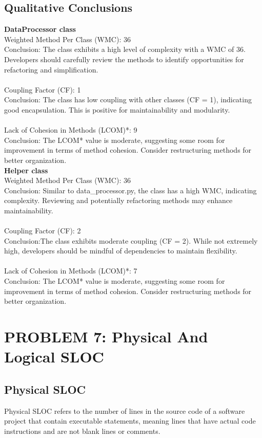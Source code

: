 \documentclass[runningheads]{llncs}
\begin{document}
\subsection{Qualitative Conclusions}
\textbf{DataProcessor class}\\
Weighted Method Per Class (WMC): 36\\
Conclusion: The class exhibits a high level of complexity with a WMC of 36. Developers should carefully review the methods to identify opportunities for refactoring and simplification.\\ \\
Coupling Factor (CF): 1\\
Conclusion: The class has low coupling with other classes (CF = 1), indicating good encapsulation. This is positive for maintainability and modularity.\\ \\
Lack of Cohesion in Methods (LCOM)*: 9\\
Conclusion: The LCOM* value is moderate, suggesting some room for improvement in terms of method cohesion. Consider restructuring methods for better organization.\\

\textbf{Helper class}\\
Weighted Method Per Class (WMC): 36\\
Conclusion: Similar to data\_processor.py, the class has a high WMC, indicating complexity. Reviewing and potentially refactoring methods may enhance maintainability.\\ \\
Coupling Factor (CF): 2\\
Conclusion:The class exhibits moderate coupling (CF = 2). While not extremely high, developers should be mindful of dependencies to maintain flexibility.\\ \\
Lack of Cohesion in Methods (LCOM)*: 7\\
Conclusion: The LCOM* value is moderate, suggesting some room for improvement in terms of method cohesion. Consider restructuring methods for better organization.

\section{PROBLEM 7: Physical And Logical SLOC}
\subsection{Physical SLOC}
Physical SLOC refers to the number of lines in the source code of a software project that contain executable statements, meaning lines that have actual code instructions and are not blank lines or comments.\\
\end{document}
